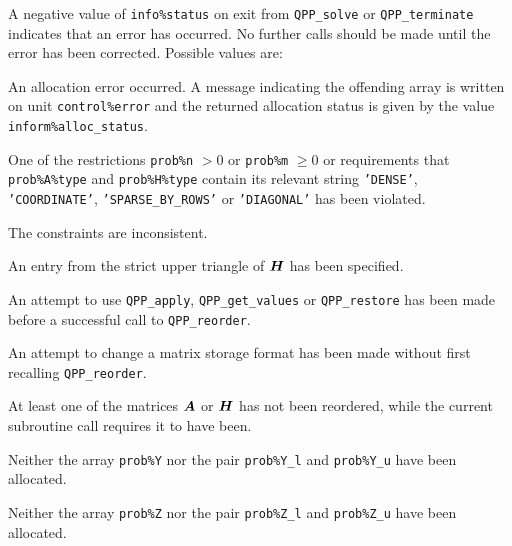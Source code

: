 \documentclass{galahad}
\newcommand{\packagename}{QPP}
\begin{document}

\galerrors
A negative value of {\tt info\%status} on exit from 
{\tt \packagename\_solve}
or 
{\tt \packagename\_terminate}
indicates that an error has occurred. No further calls should be made
until the error has been corrected. Possible values are:

\begin{description}

 An allocation error occurred. 
A message indicating the offending 
 array is written on unit {\tt control\%error} and the returned allocation 
 status is given by the value {\tt inform\%alloc\_status}.

 One of the restrictions 
{\tt prob\%n} $> 0$ or {\tt prob\%m} $\geq  0$
    or requirements that {\tt prob\%A\%type} 
    and {\tt prob\%H\%type} contain its relevant string
    {\tt 'DENSE'}, {\tt 'COORDINATE'}, {\tt 'SPARSE\_BY\_ROWS'} 
    or {\tt 'DIAGONAL'}
    has been violated.


 The constraints are inconsistent.

 An entry from the strict upper triangle of ${\bm{H}}$ 
 has been specified.

 An attempt to use 
{\tt \packagename\_apply}, {\tt \packagename\_get\_values} 
or {\tt \packagename\_restore} 
has been made before a successful call to {\tt \packagename\_reorder}. 
 
 An attempt to change a matrix storage format has been made 
without first recalling {\tt \packagename\_reorder}. 
 
 At least one of the matrices ${\bm{A}}$ or ${\bm{H}}$ has not been reordered, 
while the current subroutine call requires it to have been. 

 Neither the array {\tt prob\%Y} nor the pair {\tt prob\%Y\_l} and
{\tt prob\%Y\_u} have been allocated.

 Neither the array {\tt prob\%Z} nor the pair {\tt prob\%Z\_l} and
{\tt prob\%Z\_u} have been allocated.

\end{description}
\end{document}
